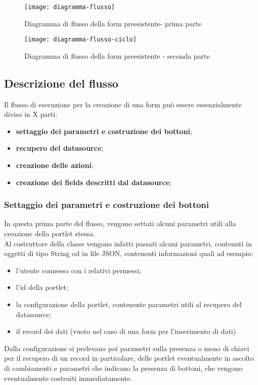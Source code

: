 \begin{figure}[p]
	\centering
	\texttt{[image: diagramma-flusso]}
	\caption{Diagramma di flusso della form preesistente- prima parte}
	\label{form-portlet-flow-diagram-1}
\end{figure}

\begin{figure}[p]
	\centering
	\texttt{[image: diagramma-flusso-ciclo]}
	\caption{Diagramma di flusso della form preesistente - seconda parte}
	\label{form-portlet-flow-diagram-2}
\end{figure}

\subsection{Descrizione del flusso}
Il flusso di esecuzione per la creazione di una form può essere essenzialmente diviso in X parti: 
\begin{itemize}
	\item \textbf{settaggio dei parametri e costruzione dei bottoni};
	\item \textbf{recupero del datasource};
	\item \textbf{creazione delle azioni};
	\item \textbf{creazione dei fields descritti dal datasource};
\end{itemize}
\subsubsection{Settaggio dei parametri e costruzione dei bottoni}
In questa prima parte del flusso, vengono settati alcuni parametri utili alla creazione della portlet stessa.\\
Al costruttore della classe vengono infatti passati alcuni parametri, contenuti in oggetti di tipo String od in file JSON, contenenti informazioni quali ad esempio:
\begin{itemize}
	\item l'utente connesso con i relativi permessi;
	\item l'id della portlet;
	\item la configurazione della portlet, contenente parametri utili al recupero del datasource;
	\item il \gls{record} dei dati (vuoto nel caso di una form per l'inserimento di dati).
\end{itemize}
Dalla configurazione si prelevano poi parametri sulla presenza o meno di chiavi per il recupero di un \gls{record} in particolare, delle portlet eventualmente in ascolto di cambiamenti e parametri che indicano la presenza di bottoni, che vengono eventualmente costruiti immediatamente.\\
